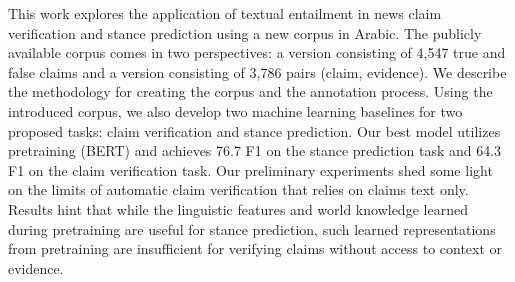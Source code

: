 This work explores the application of textual entailment in news claim verification and stance prediction using a new corpus in Arabic. The publicly available corpus comes in two perspectives: a version consisting of 4,547 true and false claims and a version consisting of 3,786 pairs (claim, evidence). We describe the methodology for creating the corpus and the annotation process. Using the introduced corpus, we also develop two machine learning baselines for two proposed tasks: claim verification and stance prediction.  Our best model utilizes pretraining (BERT) and achieves 76.7 F1 on the stance prediction task and 64.3 F1 on the claim verification task.  Our preliminary experiments shed some light on the limits of automatic claim verification that relies on claims text only. Results hint that while the linguistic features and world knowledge learned during pretraining are useful for stance prediction, such learned representations from pretraining are insufficient for verifying claims without access to context or evidence.
